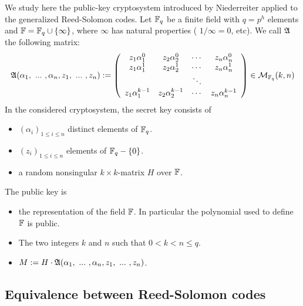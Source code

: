 \documentclass[12pt,a4paper,titlepage]{article}
\begin{document}
We study here the public-key cryptosystem introduced by Niederreiter \cite{NiederH86} applied to the generalized Reed-Solomon codes. Let $\mathbb{F}_q$ be a finite field with $q = p^h$ elements and $\mathbb{F} = \mathbb{F}_q \cup \{ \infty \}$, where $\infty$ has natural properties ( $1/\infty = 0$, etc). We call $\frak{A}$ the following matrix:
$$ \frak{A}(\alpha_1, \ ... \ , \alpha_n, z_1, \ ... \ , z_n) := \left(
\begin{array}{cccc}
z_1 \alpha_1^0 &  z_2 \alpha_2^0 & \cdots & z_n \alpha_n^0 \\
z_1 \alpha_1^1 &  z_2 \alpha_2^1 & \cdots & z_n \alpha_n^1 \\
 & & \ddots & \\
z_1 \alpha_1^{k-1} &  z_2 \alpha_2^{k-1} & \cdots & z_n \alpha_n^{k-1}
\end{array}
\right) \in \mathcal{M}_{\mathbb{F}_q}(k,n) $$
In the considered cryptosystem, the secret key consists of
\begin{itemize}
\item $(\alpha_i)_{1 \leq i \leq n}$ distinct elements of $\mathbb{F}_q$.
\item $(z_i)_{1 \leq i \leq n}$ elements of $\mathbb{F}_q - \{0\}$.
\item a random nonsingular $k\times k$-matrix $H$ over $\mathbb{F}$.
\end{itemize}
The public key is
\begin{itemize}
\item the representation of the field $\mathbb{F}$. In particular the polynomial used to define $\mathbb{F}$ is public.
\item The two integers $k$ and $n$ such that $ 0 < k < n \leq q$.
\item $M := H \cdot \frak{A}(\alpha_1, \ ... \ , \alpha_n, z_1, \ ... \ , z_n)$.
\end{itemize}

\subsection{Equivalence between Reed-Solomon codes}
\end{document}
